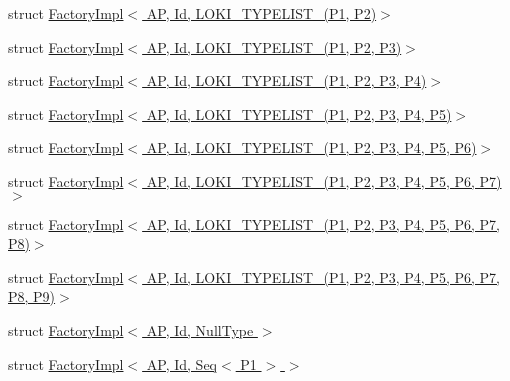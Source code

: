 \begin{DoxyCompactItemize}
\item 
struct \hyperlink{structLoki_1_1FactoryImpl_3_01AP_00_01Id_00_01LOKI__TYPELIST__2_07P1_00_01P2_08_4}{Factory\+Impl$<$ A\+P, Id, L\+O\+K\+I\+\_\+\+T\+Y\+P\+E\+L\+I\+S\+T\+\_(\+P1, P2)$>$}
\item 
struct \hyperlink{structLoki_1_1FactoryImpl_3_01AP_00_01Id_00_01LOKI__TYPELIST__3_07P1_00_01P2_00_01P3_08_4}{Factory\+Impl$<$ A\+P, Id, L\+O\+K\+I\+\_\+\+T\+Y\+P\+E\+L\+I\+S\+T\+\_(\+P1, P2, P3)$>$}
\item 
struct \hyperlink{structLoki_1_1FactoryImpl_3_01AP_00_01Id_00_01LOKI__TYPELIST__4_07P1_00_01P2_00_01P3_00_01P4_08_4}{Factory\+Impl$<$ A\+P, Id, L\+O\+K\+I\+\_\+\+T\+Y\+P\+E\+L\+I\+S\+T\+\_(\+P1, P2, P3, P4)$>$}
\item 
struct \hyperlink{structLoki_1_1FactoryImpl_3_01AP_00_01Id_00_01LOKI__TYPELIST__5_07P1_00_01P2_00_01P3_00_01P4_00_01P5_08_4}{Factory\+Impl$<$ A\+P, Id, L\+O\+K\+I\+\_\+\+T\+Y\+P\+E\+L\+I\+S\+T\+\_(\+P1, P2, P3, P4, P5)$>$}
\item 
struct \hyperlink{structLoki_1_1FactoryImpl_3_01AP_00_01Id_00_01LOKI__TYPELIST__6_07P1_00_01P2_00_01P3_00_01P4_00_01P5_00_01P6_08_4}{Factory\+Impl$<$ A\+P, Id, L\+O\+K\+I\+\_\+\+T\+Y\+P\+E\+L\+I\+S\+T\+\_(\+P1, P2, P3, P4, P5, P6)$>$}
\item 
struct \hyperlink{structLoki_1_1FactoryImpl_3_01AP_00_01Id_00_01LOKI__TYPELIST__7_07P1_00_01P2_00_01P3_00_01P4_00_01P5_00_01P6_00_01P7_08_4}{Factory\+Impl$<$ A\+P, Id, L\+O\+K\+I\+\_\+\+T\+Y\+P\+E\+L\+I\+S\+T\+\_(\+P1, P2, P3, P4, P5, P6, P7)$>$}
\item 
struct \hyperlink{structLoki_1_1FactoryImpl_3_01AP_00_01Id_00_01LOKI__TYPELIST__8_07P1_00_01P2_00_01P3_00_01P4_00_116dd2045f78a9e7ca017de1cb74bcf4}{Factory\+Impl$<$ A\+P, Id, L\+O\+K\+I\+\_\+\+T\+Y\+P\+E\+L\+I\+S\+T\+\_(\+P1, P2, P3, P4, P5, P6, P7, P8)$>$}
\item 
struct \hyperlink{structLoki_1_1FactoryImpl_3_01AP_00_01Id_00_01LOKI__TYPELIST__9_07P1_00_01P2_00_01P3_00_01P4_00_61172a57a9caff70ed7c652ec4ff7081}{Factory\+Impl$<$ A\+P, Id, L\+O\+K\+I\+\_\+\+T\+Y\+P\+E\+L\+I\+S\+T\+\_(\+P1, P2, P3, P4, P5, P6, P7, P8, P9)$>$}
\item 
struct \hyperlink{structLoki_1_1FactoryImpl_3_01AP_00_01Id_00_01NullType_01_4}{Factory\+Impl$<$ A\+P, Id, Null\+Type $>$}
\item 
struct \hyperlink{structLoki_1_1FactoryImpl_3_01AP_00_01Id_00_01Seq_3_01P1_01_4_01_4}{Factory\+Impl$<$ A\+P, Id, Seq$<$ P1 $>$ $>$}
\item 

\end{DoxyCompactItemize}
